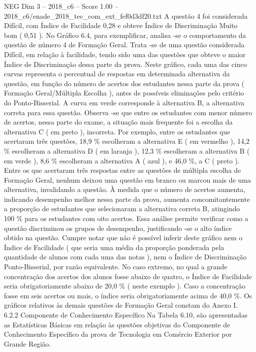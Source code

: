 \begin{textsample}{NEG Dim 3 – 2018\_c6 – Score 1.00 – 2018\_c6/enade\_2018\_tec\_com\_ext\_fef0d3df20.txt}
A questão 4 foi considerada Difícil, com Índice de Facilidade 0,28 e obteve Índice de Discriminação Muito bom ( 0,51 ).
No Gráfico 6.4, para exemplificar, analisa -se o comportamento da questão de número 4 de Formação Geral.
Trata -se de uma questão considerada Difícil, em relação à facilidade, tendo sido uma das questões que obteve o maior Índice de Discriminação dessa parte da prova.
Neste gráfico, cada uma das cinco curvas representa o percentual de respostas em determinada alternativa da questão, em função do número de acertos dos estudantes nessa parte da prova ( Formação Geral/Múltipla Escolha ), antes de possíveis eliminações pelo critério do Ponto-Bisserial.
A curva em verde corresponde à alternativa B, a alternativa correta para essa questão.
Observa -se que entre os estudantes com menor número de acertos, nessa parte do exame, a situação mais frequente foi a escolha da alternativa C ( em preto ), incorreta.
Por exemplo, entre os estudantes que acertaram três questões, 18,9 \% escolheram a alternativa E ( em vermelho ), 14,2 \% escolheram a alternativa D ( em laranja ), 12,3 \% escolheram a alternativa B ( em verde ), 8,6 \% escolheram a alternativa A ( azul ), e 46,0 \%, a C ( preto ).
Entre os que acertaram três respostas entre as questões de múltipla escolha de Formação Geral, nenhum deixou uma questão em branco ou marcou mais de uma alternativa, invalidando a questão.
À medida que o número de acertos aumenta, indicando desempenho melhor nessa parte da prova, aumenta concomitantemente a proporção de estudantes que selecionaram a alternativa correta B, atingindo 100 \% para os estudantes com oito acertos.
Essa análise permite verificar como a questão discriminou os grupos de desempenho, justificando -se o alto índice obtido na questão.
Cumpre notar que não é possível inferir deste gráfico nem o Índice de Facilidade ( que seria uma média da proporção ponderada pela quantidade de alunos com cada uma das notas ), nem o Índice de Discriminação Ponto-Bisserial, por razão equivalente.
No caso extremo, no qual a grande concentração dos acertos dos alunos fosse abaixo de quatro, o Índice de Facilidade seria obrigatoriamente abaixo de 20,0 \% ( neste exemplo ).
Caso a concentração fosse em seis acertos ou mais, o índice seria obrigatoriamente acima de 40,0 \%.
Os gráficos relativos às demais questões de Formação Geral constam do Anexo I. 6.2.2 Componente de Conhecimento Específico Na Tabela 6.10, são apresentadas as Estatísticas Básicas em relação às questões objetivas do Componente de Conhecimento Específico da prova de Tecnologia em Comércio Exterior por Grande Região.

\end{textsample}
